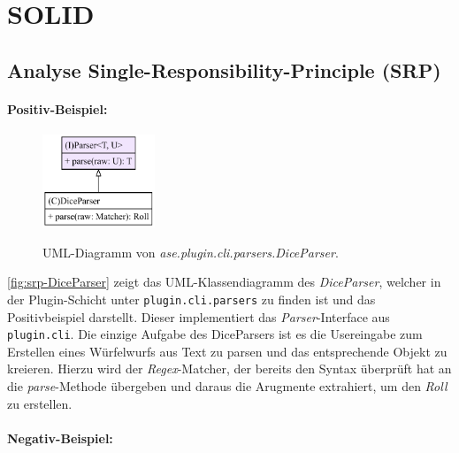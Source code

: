 \chapter{SOLID}

\section{Analyse Single-Responsibility-Principle (SRP)}

\subsubsection{Positiv-Beispiel:}

\begin{figure}
	\centering
	\vspace{-30pt} %
	\includegraphics[width=0.30\textwidth]{Bilder/DiceParser_structure.pdf}
	\vspace{-10pt}
	\caption[UML-Diagramm von ase.plugin.cli.parsers.DiceParser.]{\unskip}
	UML-Diagramm von \textit{ase.plugin.cli.parsers.DiceParser}.
	\label{fig:srp-DiceParser}
\end{figure}

\autoref{fig:srp-DiceParser} zeigt das UML-Klassendiagramm des \textit{DiceParser}, welcher in der Plugin-Schicht
unter \texttt{plugin.cli.parsers} zu finden ist und das Positivbeispiel darstellt. 
Dieser implementiert das \textit{Parser}-Interface aus 
\texttt{plugin.cli}. Die einzige Aufgabe des DiceParsers ist es die Usereingabe zum Erstellen eines Würfelwurfs
aus Text zu parsen und das entsprechende Objekt zu kreieren. Hierzu wird der \textit{Regex}-Matcher, der 
bereits den Syntax überprüft hat an die \textit{parse}-Methode übergeben und daraus die Arugmente extrahiert, 
um den \textit{Roll} zu erstellen.

\subsubsection{Negativ-Beispiel:}

